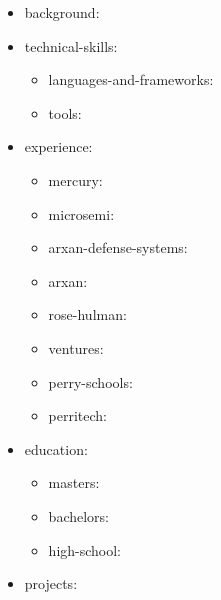 \documentclass[11pt, letterpaper]{awesome-cv}
\begin{document}
\makecvheader[R]


\iffalse
{}
\begin{cvparagraph}
\begin{itemize}[leftmargin=2ex, nosep, noitemsep]
\item background: 
\item technical-skills: 
	\begin{itemize}[leftmargin=2ex, nosep, noitemsep]
	\item languages-and-frameworks: 
	\item tools: 
	\end{itemize}
\item experience: 
	\begin{itemize}[leftmargin=2ex, nosep, noitemsep]
	\item mercury: 
	\item microsemi: 
	\item arxan-defense-systems: 
	\item arxan: 
	\item rose-hulman: 
	\item ventures: 
	\item perry-schools: 
	\item perritech: 
	\end{itemize}
\item education: 
	\begin{itemize}[leftmargin=2ex, nosep, noitemsep]
	\item masters: 
	\item bachelors: 
	\item high-school: 
	\end{itemize}
\item projects: 

\end{itemize}
\end{cvparagraph}
\end{document}
